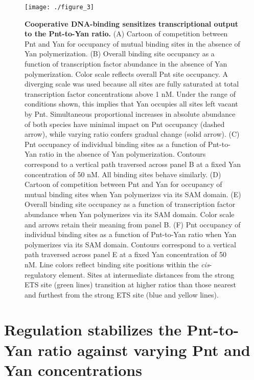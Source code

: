 \begin{figure}[h!]
\centering
\texttt{[image: ./figure\_3]}
\caption[Cooperative DNA-binding sensitizes transcriptional output to the Pnt-to-Yan ratio.]{\textbf{Cooperative DNA-binding sensitizes transcriptional output to the Pnt-to-Yan ratio.} (A) Cartoon of competition between Pnt and Yan for occupancy of mutual binding sites in the absence of Yan polymerization. (B) Overall binding site occupancy as a function of transcription factor abundance in the absence of Yan polymerization. Color scale reflects overall Pnt site occupancy. A diverging scale was used because all sites are fully saturated at total transcription factor concentrations above 1 nM. Under the range of conditions shown, this implies that Yan occupies all sites left vacant by Pnt. Simultaneous proportional increases in absolute abundance of both species have minimal impact on Pnt occupancy (dashed arrow), while varying ratio confers gradual change (solid arrow). (C) Pnt occupancy of individual binding sites as a function of Pnt-to-Yan ratio in the absence of Yan polymerization. Contours correspond to a vertical path traversed across panel B at a fixed Yan concentration of 50 nM. All binding sites behave similarly. (D) Cartoon of competition between Pnt and Yan for occupancy of mutual binding sites when Yan polymerizes via its SAM domain. (E) Overall binding site occupancy as a function of transcription factor abundance when Yan polymerizes via its SAM domain. Color scale and arrows retain their meaning from panel B. (F) Pnt occupancy of individual binding sites as a function of Pnt-to-Yan ratio when Yan polymerizes via its SAM domain. Contours correspond to a vertical path traversed across panel E at a fixed Yan concentration of 50 nM. Line colors reflect binding site positions within the \textit{cis}-regulatory element. Sites at intermediate distances from the strong ETS site (green lines) transition at higher ratios than those nearest and furthest from the strong ETS site (blue and yellow lines).}
\label{fig:ratio:fig3}
\end{figure}

\section{Regulation stabilizes the Pnt-to-Yan ratio against varying Pnt and Yan concentrations}

